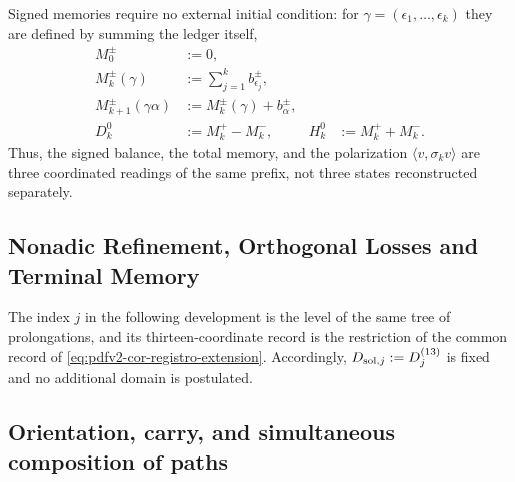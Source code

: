 Signed memories require no external initial condition: for
\(\gamma=(\epsilon_1,\ldots,\epsilon_k)\) they are defined by summing the ledger itself,
\begin{equation}
\label{eq:pdfv2-cor-memorias}
 \begin{aligned}
 M_0^\pm&:=0,\\
 M_k^\pm(\gamma)&:=\sum_{j=1}^k b_{\epsilon_j}^\pm,\\
 M_{k+1}^\pm(\gamma\alpha)&:=M_k^\pm(\gamma)+b_\alpha^\pm,\\
 D_k^0&:=M_k^+-M_k^-, &
 H_k^0&:=M_k^++M_k^-.
 \end{aligned}
\end{equation}
Thus, the signed balance, the total memory, and the polarization
\(\langle v,\sigma_kv\rangle\) are three coordinated readings of the same
prefix, not three states reconstructed separately.

\subsection{Nonadic Refinement, Orthogonal Losses and Terminal Memory}
The index \(j\) in the following development is the level of the same tree of
prolongations, and its thirteen-coordinate record is the restriction of the
common record of \eqref{eq:pdfv2-cor-registro-extension}. Accordingly,
\(D_{{\rm sol},j}:=D_j^{(13)}\) is fixed and no additional domain is postulated.
\begingroup
  \let\section\subsection
  
\endgroup

\section{Orientation, carry, and simultaneous composition of paths}

